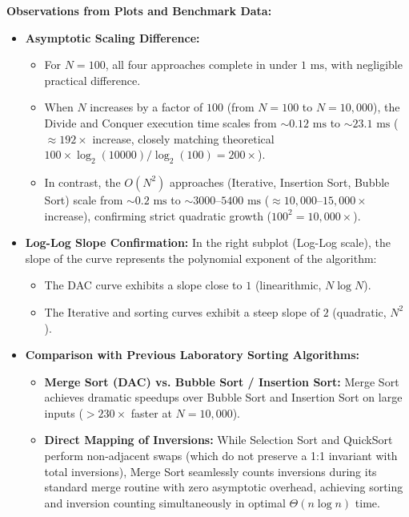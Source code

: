 \documentclass[12pt]{article}
\begin{document}
\textbf{Observations from Plots and Benchmark Data:}
\begin{itemize}
    \item \textbf{Asymptotic Scaling Difference:}
    \begin{itemize}
        \item For $N = 100$, all four approaches complete in under $1\text{ ms}$, with negligible practical difference.
        \item When $N$ increases by a factor of $100$ (from $N = 100$ to $N = 10,000$), the Divide and Conquer execution time scales from $\sim 0.12\text{ ms}$ to $\sim 23.1\text{ ms}$ ($\approx 192\times$ increase, closely matching theoretical $100 \times \log_2(10000)/\log_2(100) = 200\times$).
        \item In contrast, the $O(N^2)$ approaches (Iterative, Insertion Sort, Bubble Sort) scale from $\sim 0.2\text{ ms}$ to $\sim 3000\text{--}5400\text{ ms}$ ($\approx 10,000\text{--}15,000\times$ increase), confirming strict quadratic growth ($100^2 = 10,000\times$).
    \end{itemize}

    \item \textbf{Log-Log Slope Confirmation:}
    In the right subplot (Log-Log scale), the slope of the curve represents the polynomial exponent of the algorithm:
    \begin{itemize}
        \item The DAC curve exhibits a slope close to $1$ (linearithmic, $N \log N$).
        \item The Iterative and sorting curves exhibit a steep slope of $2$ (quadratic, $N^2$).
    \end{itemize}

    \item \textbf{Comparison with Previous Laboratory Sorting Algorithms:}
    \begin{itemize}
        \item \textbf{Merge Sort (DAC) vs. Bubble Sort / Insertion Sort:} Merge Sort achieves dramatic speedups over Bubble Sort and Insertion Sort on large inputs ($>230\times$ faster at $N=10,000$).
        \item \textbf{Direct Mapping of Inversions:} While Selection Sort and QuickSort perform non-adjacent swaps (which do not preserve a 1:1 invariant with total inversions), Merge Sort seamlessly counts inversions during its standard merge routine with zero asymptotic overhead, achieving sorting and inversion counting simultaneously in optimal $\Theta(n \log n)$ time.
    \end{itemize}
\end{itemize}
\end{document}
